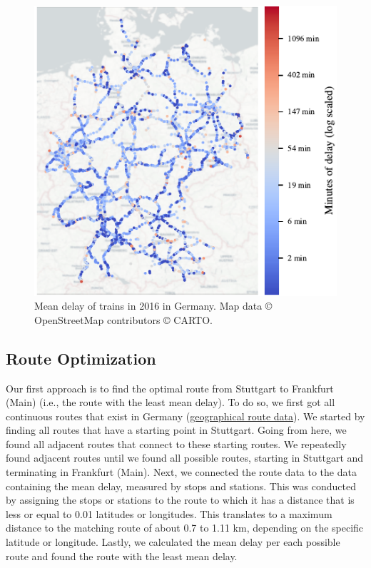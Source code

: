 \documentclass{article}
\theoremstyle{plain}
\theoremstyle{definition}
\theoremstyle{remark}
\begin{document}
\begin{figure} %
\begin{center}
\includegraphics{fig/maps_KI_01_all_data_cmap.pdf} %
\end{center}
\caption{Mean delay of trains in 2016 in Germany. Map data © OpenStreetMap contributors © CARTO.}
\end{figure}

\subsection{Route Optimization}\label{sec:methods_route}

Our first approach is to find the optimal route from Stuttgart to Frankfurt (Main) (i.e., the route with the least mean delay). To do so, we first got all continuous routes that exist in Germany (\href{https://data.deutschebahn.com/dataset/betriebsstellen-gueterverkehr.html}{geographical route data}). We started by finding all routes that have a starting point in Stuttgart. Going from here, we found all adjacent routes that connect to these starting routes. We repeatedly found adjacent routes until we found all possible routes, starting in Stuttgart and terminating in Frankfurt (Main). Next, we connected the route data to the data containing the mean delay, measured by stops and stations. This was conducted by assigning the stops or stations to the route to which it has a distance that is less or equal to 0.01 latitudes or longitudes. This translates to a maximum distance to the matching route of about 0.7 to 1.11 km, depending on the specific latitude or longitude. Lastly, we calculated the mean delay per each possible route and found the route with the least mean delay.
\end{document}
